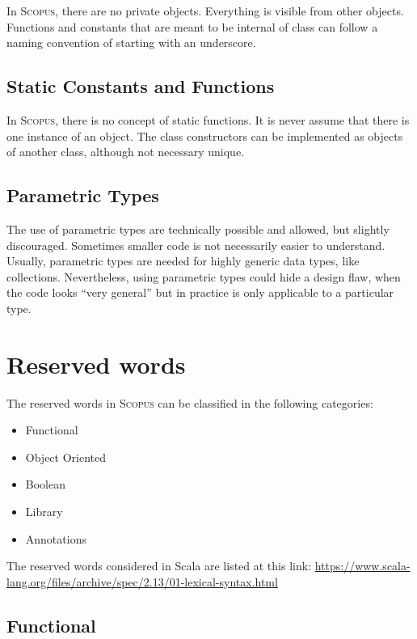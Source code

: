 \documentclass[12pt,a4paper]{article}
\newcommand{\Scopus}{\textsc{Scopus}\xspace}
\begin{document}
    In \Scopus, there are no private objects.
    Everything is visible from other objects.
    Functions and constants that are meant to be internal of class can follow a naming convention of starting with an underscore.

    \subsection{Static Constants and Functions}

    In \Scopus, there is no concept of static functions.
    It is never assume that there is one instance of an object.
    The class constructors can be implemented as objects of another class, although not necessary unique.

    \subsection{Parametric Types}

    The use of parametric types are technically possible and allowed, but slightly discouraged.
    Sometimes smaller code is not necessarily easier to understand.
    Usually, parametric types are needed for highly generic data types, like collections.
    Nevertheless, using parametric types could hide a design flaw, when the code looks ``very general'' but in practice is only applicable to a particular type.


    \section{Reserved words}

    The reserved words in \Scopus can be classified in the following categories:

    \begin{itemize}
        \item Functional
        \item Object Oriented
        \item Boolean
        \item Library
        \item Annotations
    \end{itemize}


    The reserved words considered in Scala are listed at this link:
    \url{https://www.scala-lang.org/files/archive/spec/2.13/01-lexical-syntax.html}

    \subsection{Functional}
\end{document}
